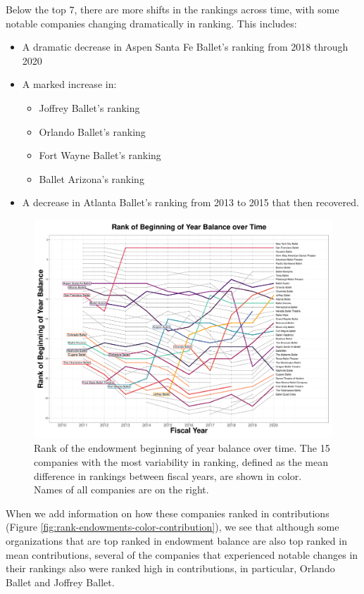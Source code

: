\documentclass[Dance Data
Project,article,submit,moreauthors,pdftex]{mdpi}
\providecommand{\tightlist}{%
  \setlength{\itemsep}{0pt}\setlength{\parskip}{0pt}}
\begin{document}
Below the top 7, there are more shifts in the rankings across time, with
some notable companies changing dramatically in ranking. This includes:

\begin{itemize}
\tightlist
\item
  A dramatic decrease in Aspen Santa Fe Ballet's ranking from 2018
  through 2020
\item
  A marked increase in:

  \begin{itemize}
  \tightlist
  \item
    Joffrey Ballet's ranking
  \item
    Orlando Ballet's ranking
  \item
    Fort Wayne Ballet's ranking
  \item
    Ballet Arizona's ranking
  \end{itemize}
\item
  A decrease in Atlanta Ballet's ranking from 2013 to 2015 that then
  recovered.
\end{itemize}

\begin{figure}[H]
\includegraphics[width=0.9\linewidth,]{../images/rank_of_beginning_year_balance} \caption{\label{fig:rank-endowments}Rank of the endowment beginning of year balance over time. The 15 companies with the most variability in ranking, defined as the mean difference in rankings between fiscal years, are shown in color. Names of all companies are on the right.}\label{fig:rank-og-beginning-year-balance}
\end{figure}

When we add information on how these companies ranked in contributions
(Figure \ref{fig:rank-endowments-color-contribution}), we see that
although some organizations that are top ranked in endowment balance are
also top ranked in mean contributions, several of the companies that
experienced notable changes in their rankings also were ranked high in
contributions, in particular, Orlando Ballet and Joffrey Ballet.
\end{document}
